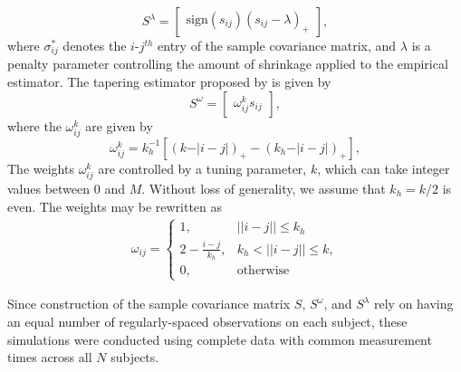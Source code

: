 \[
S^{\lambda}=   \begin{bmatrix} \mbox{sign}\left(s_{ij}\right) \left(s_{ij} - \lambda\right)_+ \end{bmatrix},
\]
\noindent 
where $\sigma^*_{ij}$ denotes the $i$-$j^{th}$ entry of the sample covariance matrix, and $\lambda$ is a penalty parameter controlling the amount of shrinkage applied to the empirical estimator. The tapering estimator proposed by \cite{cai2010optimal} is given by
\[
S^{\omega} =  \begin{bmatrix} \omega_{ij}^k s_{ij} \end{bmatrix},
\]
\noindent
where the $\omega_{ij}^k$ are given by 
\begin{equation*}
\omega^k_{ij} = k_h^{-1} \left[ \left( k - \vert i-j\vert\right)_+ - \left(k_h - \vert i-j\vert\right)_+ \right],
\end{equation*}
\noindent
The weights $\omega^k_{ij}$ are controlled by a tuning parameter, $k$,  which can take integer values between 0 and $M$. Without loss of generality,  we assume that $k_h = k/2$ is even. The weights may be rewritten as
\begin{align*}
\omega_{ij} = \left\{\begin{array}{ll} 1, & \vert \vert i -j \vert \vert \le k_h \\
                             2 - \frac{i - j}{k_h}, & k_h < \vert \vert i -j \vert \vert \le k, \\
                             0, & \mbox{otherwise}  \end{array} \right.
\end{align*}
\noindent

\bigskip

Since construction of the sample covariance matrix $S$, $S^\omega$, and $S^\lambda$ rely on having an equal number of regularly-spaced observations on each subject, these simulations were conducted using complete data with common measurement times across all $N$ subjects. 

%


